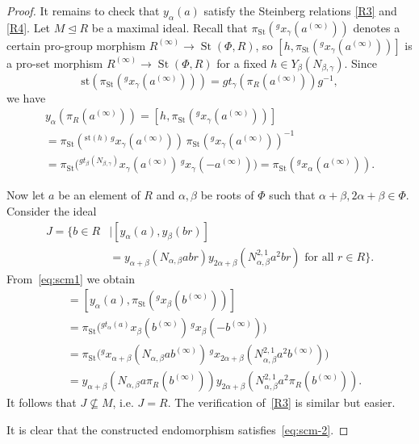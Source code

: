 \documentclass[oneside, 11pt]{amsart}
\numberwithin{equation}{section}
\theoremstyle{definition}
\theoremstyle{remark}
\DeclareMathOperator\St{St}
\newcommand{\up}[2]{{^{#1}\!{#2}}}
\begin{document}
\begin{proof}
 It remains to check that \(y_\alpha(a)\) satisfy the Steinberg relations \eqref{R3} and \eqref{R4}.
 Let \(M \trianglelefteq R\) be a maximal ideal. Recall that \(\pi_{\St}(\up g{x_\gamma(a^{(\infty)})})\) denotes a certain pro-group morphism \(R^{(\infty)} \to \St(\Phi, R)\), so \([h, \pi_{\St}(\up g{x_\gamma(a^{(\infty)})})]\) is a pro-set morphism \(R^{(\infty)} \to \St(\Phi, R)\) for a fixed \(h \in Y_\beta(N_{\beta, \gamma})\). Since
 \[\mathrm{st}(\pi_{\St}(\up g{x_\gamma(a^{(\infty)})})) = g t_\gamma(\pi_R(a^{(\infty)})) g^{-1},\]
 we have
 \begin{multline} \label{eq:scm1}
  y_\alpha(\pi_R(a^{(\infty)})) = [h, \pi_{\St}(\up g{x_\gamma(a^{(\infty)})})]\\
  = \pi_{\St}(\up{\mathrm{st}(h)\, g}{x_\gamma(a^{(\infty)})})\, \pi_{\St}(\up g{x_\gamma(a^{(\infty)})})^{-1}\\
  = \pi_{\St}\bigl(\up{g t_\beta(N_{\beta, \gamma})}{x_\gamma(a^{(\infty)})}\, \up g{x_\gamma(-a^{(\infty)})}\bigr) = \pi_{\St}(\up g{x_\alpha(a^{(\infty)})}).
 \end{multline}
 
 Now let $a$ be an element of $R$ and \(\alpha, \beta\) be roots of $\Phi$ such that \(\alpha + \beta, 2\alpha + \beta \in \Phi\). 
 Consider the ideal
 \begin{align*}
 J = \{b \in R &\mid [y_\alpha(a), y_\beta(br)] \\
 &= y_{\alpha + \beta}(N_{\alpha, \beta} abr)
 y_{2\alpha + \beta}(N_{\alpha, \beta}^{2,1} a^2 br) \text{ for all } r \in R\}.
 \end{align*}
 From~\eqref{eq:scm1} we obtain 
 \begin{align*}
 [y_\alpha(a), y_\beta(\pi_R(b^{(\infty)}))] &= [y_\alpha(a), \pi_{\St}(\up g{x_\beta(b^{(\infty)})})]\\ 
 &= \pi_{\St}\bigl(\up{g t_\alpha(a)}{x_\beta(b^{(\infty)})}\, \up g{x_\beta(-b^{(\infty)})}\bigr)\\
 &= \pi_{\St}\bigl(\up g{x_{\alpha + \beta}(N_{\alpha, \beta} a b^{(\infty)})}\, \up g{x_{2\alpha + \beta}(N_{\alpha, \beta}^{2,1} a^2 b^{(\infty)})}\bigr)\\
 &= y_{\alpha + \beta}(N_{\alpha, \beta} a \pi_R(b^{(\infty)})) y_{2\alpha + \beta}(N_{\alpha, \beta}^{2,1} a^2 \pi_R(b^{(\infty)})).
 \end{align*}
 It follows that \(J \not \subseteq M\), i.e. \(J = R\). The verification of~\eqref{R3} is similar but easier.   
 
 It is clear that the constructed endomorphism satisfies~\eqref{eq:scm-2}. \end{proof}
 
\end{document}
